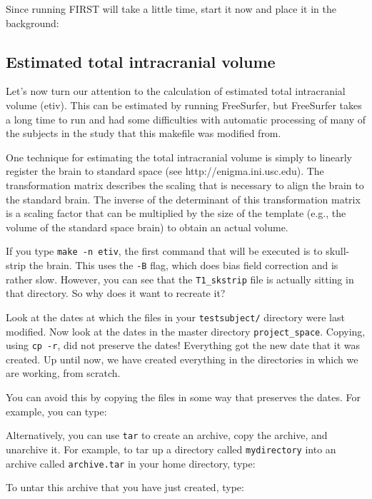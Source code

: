 Since running FIRST will take a little time, start it now and place it in the background:

\subsection{Estimated total intracranial volume}
Let's now turn our attention to the calculation of estimated total intracranial volume (etiv). This can be estimated by running FreeSurfer, but FreeSurfer takes a long time to run and had some difficulties with automatic processing of many of the subjects in the study that this makefile was modified from. 

One technique for estimating the total intracranial volume is simply
to linearly register the brain to standard space (see http://enigma.ini.usc.edu). The transformation
matrix describes the scaling that is necessary to align the brain to
the standard brain. The inverse of the determinant of this
transformation matrix is a scaling factor that can be multiplied by the size of the template (e.g., the volume of the standard space brain) to obtain an actual volume.

If you type \texttt{make -n etiv}, the first command that will be executed is to skull-strip the brain. This uses the \texttt{-B} flag, which does bias field correction and is rather slow. However, you can see that the \texttt{T1_skstrip} file is actually sitting in that directory. So why does it want to recreate it?

Look at the dates at which the files in your \texttt{testsubject/} directory were last modified. Now look at the dates in the master directory \texttt{project_space}. Copying, using \texttt{cp -r}, did not preserve the dates! Everything got the new date that it was created. Up until now, we have created everything in the directories in which we are working, from scratch. 

You can avoid this by copying the files in some way that preserves the dates. For example,
you can type:

Alternatively, you can use \texttt{tar} to create an archive, copy the archive, and unarchive it.
For example, to tar up a directory called \texttt{mydirectory} into an archive called \texttt{archive.tar} in your home directory, type:

To untar this archive that you have just created, type:

